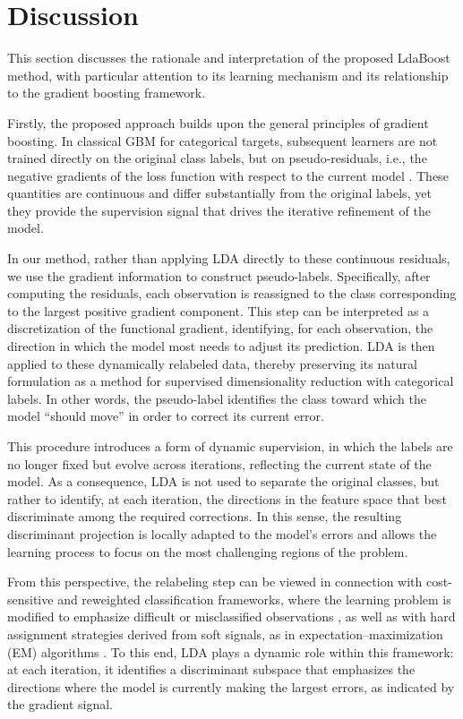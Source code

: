 \documentclass[11pt,a4paper]{article}
\begin{document}
{\color{red}
\section{Discussion}
This section discusses the rationale and interpretation of the proposed LdaBoost method, with particular attention to its learning mechanism and its relationship to the gradient boosting framework.

Firstly, the proposed approach builds upon the general principles of gradient boosting. In classical GBM for categorical targets, subsequent learners are not trained directly on the original class labels, but on pseudo-residuals, i.e., the negative gradients of the loss function with respect to the current model \citep{friedman2001gbm}. These quantities are continuous and differ substantially from the original labels, yet they provide the supervision signal that drives the iterative refinement of the model.

In our method, rather than applying LDA directly to these continuous residuals, we use the gradient information to construct pseudo-labels. Specifically, after computing the residuals, each observation is reassigned to the class corresponding to the largest positive gradient component.
This step can be interpreted as a discretization of the functional gradient, identifying, for each observation, the direction in which the model most needs to adjust its prediction. LDA is then applied to these dynamically relabeled data, thereby preserving its natural formulation as a method for supervised dimensionality reduction with categorical labels. In other words, the pseudo-label identifies the class toward which the model ``should move'' in order to correct its current error.

This procedure introduces a form of dynamic supervision, in which the labels are no longer fixed but evolve across iterations, reflecting the current state of the model. As a consequence, LDA is not used to separate the original classes, but rather to identify, at each iteration, the directions in the feature space that best discriminate among the required corrections. In this sense, the resulting discriminant projection is locally adapted to the model's errors and allows the learning process to focus on the most challenging regions of the problem.

From this perspective, the relabeling step can be viewed in connection with cost-sensitive and reweighted classification frameworks, where the learning problem is modified to emphasize difficult or misclassified observations \citep{elkan2001cost, zadrozny2003cost}, as well as with hard assignment strategies derived from soft signals, as in expectation--maximization (EM) algorithms \citep{dempster1977em}. To this end, LDA plays a dynamic role within this framework: at each iteration, it identifies a discriminant subspace that emphasizes the directions where the model is currently making the largest errors, as indicated by the gradient signal.

}
\end{document}
